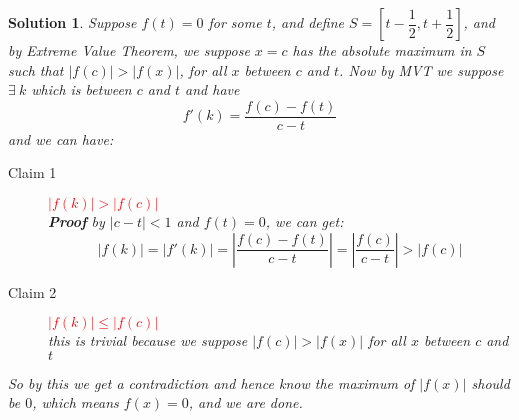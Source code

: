 \documentclass[12pt,a4paper]{article}
\newcommand{\red}[1]{\textcolor{red}{#1}}
\theoremstyle{mystyle}
\numberwithin{figure}{subsection}
\newtheorem{sol}{Solution}[subsection]%
\begin{document}
\begin{sol}
Suppose $f(t)=0$ for some $t$, and define $S=\left[t-\dfrac{1}{2}, t+\dfrac{1}{2}\right]$, and by Extreme Value Theorem, we suppose $x=c$ has the absolute maximum in $S$ such that $|f(c)| > |f(x)|$, for all $x$ between $c$ and $t$. Now by MVT we suppose $\exists \ k$ which is between $c$ and $t$ and have
\[
f'(k) = \dfrac{f(c)-f(t)}{c-t}
\]
and we can have:
\begin{description}
    \item[Claim 1]  \red{$|f(k)| > |f(c)|$} \\
    \textbf{Proof} by $|c-t|<1$ and $f(t)=0$, we can get:
    \[
    |f(k)|=|f'(k)| = \left|\dfrac{f(c)-f(t)}{c-t}\right|=\left|\dfrac{f(c)}{c-t}\right|>|f(c)|
    \]
    \item[Claim 2] \red{$|f(k)| \le |f(c)|$} \\
    this is trivial because we suppose $|f(c)| > |f(x)|$ for all $x$ between $c$ and $t$
\end{description}
So by this we get a contradiction and hence know the maximum of $|f(x)|$ should be $0$, which means $f(x)=0$, and we are done.
\end{sol}
\end{document}
